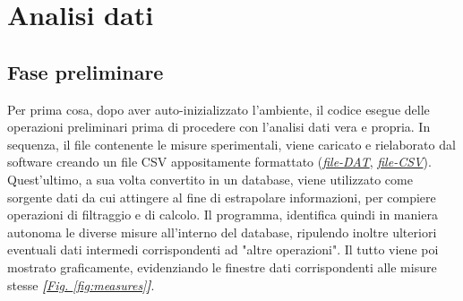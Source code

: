 \documentclass[a4paper,10pt]{article}                                                                                       %
\begin{document}
\section{Analisi dati}                                                                                                      %
\label{sec:data_analysis}                                                                                                   %
\subsection{Fase preliminare}                                                                                               %
\label{subsec:prelim_phase}                                                                                                 %
  Per prima cosa, dopo aver auto-inizializzato l'ambiente, il codice esegue delle operazioni preliminari prima di
  procedere con l'analisi dati vera e propria. In sequenza, il file contenente le misure sperimentali, viene caricato e
  rielaborato dal software creando un file CSV appositamente formattato
  (\textit{\href{https://github.com/CristianMerli/DataAnalysis/blob/master/data_analysis/dataset/scambiatore26112021_5.dat}{file-DAT}},
  \textit{\href{https://github.com/CristianMerli/DataAnalysis/blob/master/data_analysis/dataset/scambiatore26112021_5.csv}{file-CSV}}).
  Quest'ultimo, a sua volta convertito in un database, viene utilizzato come sorgente dati da cui attingere al fine di
  estrapolare informazioni, per compiere operazioni di filtraggio e di calcolo. Il programma, identifica quindi in maniera
  autonoma le diverse misure all'interno del database, ripulendo inoltre ulteriori eventuali dati intermedi corrispondenti
  ad "altre operazioni". Il tutto viene poi mostrato graficamente, evidenziando le finestre dati corrispondenti alle
  misure stesse \textit{\textbf{[}\hyperref[fig:measures]{Fig. }\ref{fig:measures}\textbf{]}}.
\end{document}
